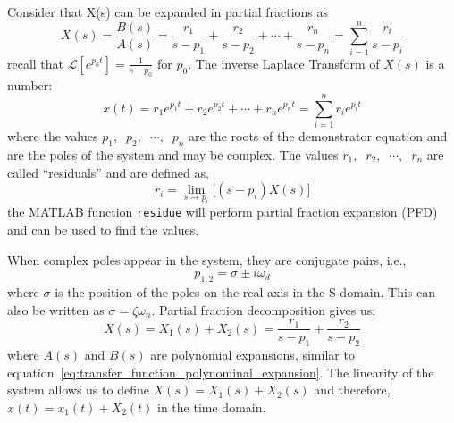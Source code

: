 \documentclass[12pt,letter]{article}
\numberwithin{ex}{section} %
\numberwithin{re}{section} %
\newcommand{\Laplace}[1]{\ensuremath{\mathcal{L}{\left[#1\right]}}}
\numberwithin{equation}{section}	%
\begin{document}
Consider that X(s) can be expanded in partial fractions as
\begin{equation}
X(s) = \frac{B(s)}{A(s)} = \frac{r_1}{s-p_1} + \frac{r_2}{s-p_2} + \cdots + \frac{r_n}{s-p_n} = \sum_{i=1}^{n}  \frac{r_i}{s-p_i}
\end{equation}
recall that $\Laplace{e^{p_0t}} =  \frac{1}{s-p_0}$ for $p_0$. The inverse Laplace Transform of $X(s)$ is a number:
\begin{equation}
x(t) = r_1 e^{p_1 t} + r_2 e^{p_2 t}  + \cdots + r_n e^{p_n t}  = \sum_{i=1}^{n}  r_i e^{p_i t}
\end{equation}
where the values $p_1, \;\; p_2, \;\; \cdots, \;\;  p_n$ are the roots of the demonstrator equation and are the poles of the system and may be complex. The values $r_1, \;\; r_2, \;\; \cdots, \;\;  r_n$ are called ``residuals'' and are defined as,
\begin{equation}
r_i = \lim\limits_{s \rightarrow p_i} \big[(s-p_i)X(s) \big]
\end{equation}
the MATLAB function \texttt{residue} will perform partial fraction expansion (PFD) and can be used to find the values. 

When complex poles appear in the system, they are conjugate pairs, i.e., 
\begin{equation}
p_{1,2} = \sigma \pm i \omega_d
\end{equation}
where $\sigma$ is the position of the poles on the real axis in the S-domain. This can also be written as $\sigma = \zeta \omega_n$. Partial fraction decomposition gives us:
\begin{equation}
X(s) = X_1(s) + X_2(s) = \frac{r_1}{s-p_1} + \frac{r_2}{s-p_2}
\label{eq:linear_X_s_with_residuales}
\end{equation}
where $A(s)$ and $B(s)$ are polynomial expansions, similar to equation~\ref{eq:transfer_function_polynominal_expansion}. The linearity of the system allows us to define $X(s) = X_1(s) + X_2(s)$ and therefore, $x(t) = x_1(t) + X_2(t)$ in the time domain. 
\end{document}

